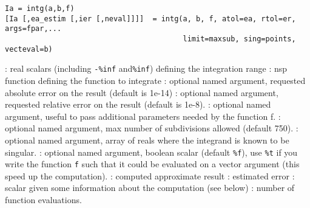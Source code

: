 
\begin{mandesc}
\end{mandesc}

\begin{calling_sequence}
\begin{verbatim}
Ia = intg(a,b,f)
[Ia [,ea_estim [,ier [,neval]]]]  = intg(a, b, f, atol=ea, rtol=er, args=fpar,... 
                                         limit=maxsub, sing=points, vecteval=b)
\end{verbatim}
\end{calling_sequence}
\begin{parameters}
  \begin{varlist}
    :  real scalars (including \verb+-%inf+ and\verb+%inf+) defining the integration range
    : nsp function defining the function to integrate
    : optional named argument, requested absolute error
                      on the result (default is 1e-14)
    : optional named argument, requested relative error
                      on the result (default is 1e-8).
    : optional named argument, useful to pass
    additional parameters needed by the function f.
    : optional named argument, max number of
    subdivisions allowed (default 750).
    : optional named argument, array of reals where the integrand
    is known to be singular.
    : optional named argument, boolean scalar
    (default \verb+%f+), use \verb+%t+ if you write the function
                   \verb+f+ such that it could be evaluated on a
                   vector argument (this speed up the computation).
    : computed approximate result
    : estimated error
    : scalar given some information about the computation (see below)
    : number of function evaluations.
  \end{varlist}
\end{parameters}


